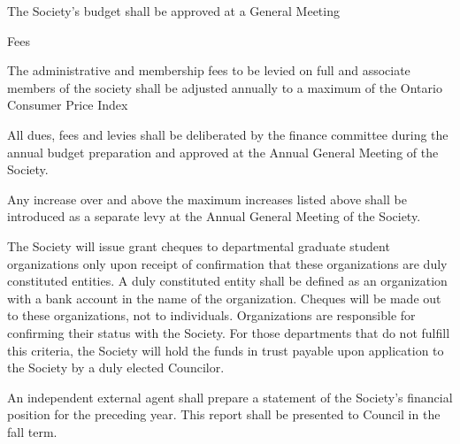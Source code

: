 \begin{longenum}[ label*=\thesection.\arabic*., align=left]
    \item The Society's budget shall be approved at a General Meeting
    \item Fees
    \begin{longenum}[ label*=\arabic*., align=left]
		\item The administrative and membership fees to be levied on full and associate members of the society shall be adjusted annually to a maximum of the Ontario Consumer Price Index
        
        \item All dues, fees and levies shall be deliberated by the finance committee
during the annual budget preparation and approved at the Annual General Meeting of the
Society.

		\item Any increase over and above the maximum increases listed above shall be introduced as a separate levy at the Annual General Meeting of the Society.
        
        
	\end{longenum}
    \item The Society will issue grant cheques to departmental graduate student organizations only upon receipt of confirmation that these organizations are duly constituted entities. A duly constituted entity shall be defined as an organization with a bank account in the name of the organization. Cheques will be made out to these organizations, not to individuals. Organizations are responsible for confirming their status with the Society. For those departments that do not fulfill this criteria, the Society will hold the funds in trust payable upon application to the Society by a duly elected Councilor.
    \item An independent external agent shall prepare a statement of the Society's financial position for the preceding year. This report shall be presented to Council in the fall term.
\end{longenum}
\newpage



